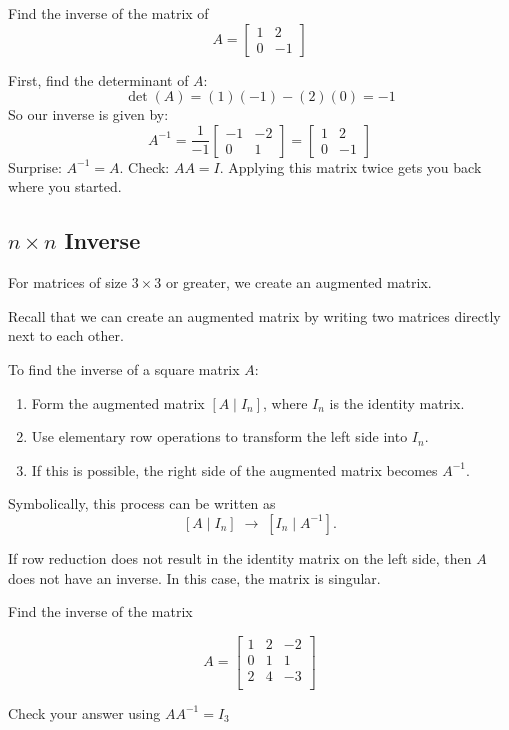 \begin{Exercise}[title={$2 \times 2$ Practice}, label={ex:inverse1}]
Find the inverse of the matrix of
\[
A = \begin{bmatrix}
1 & 2  \\
0 & -1 
\end{bmatrix}
\]
\end{Exercise}
\begin{Answer}[ref={ex:inverse1}]
First, find the determinant of $A$:
$$\det(A) = (1)(-1) - (2)(0) = -1$$
So our inverse is given by:
$$A^{-1} = \frac{1}{-1}\begin{bmatrix}
-1 & -2 \\
0 & 1
\end{bmatrix} = \begin{bmatrix}
1 & 2 \\
0 & -1
\end{bmatrix}$$
Surprise: $A^{-1} = A$. Check: $AA = I$. Applying this matrix twice gets you
back where you started.

\end{Answer}
\subsection*{$n \times n$ Inverse}
For matrices of size \(3 \times 3\) or greater, we create an augmented matrix.

Recall that we can create an augmented matrix by writing two matrices directly next to each other. 

To find the inverse of a square matrix \(A\):
\begin{enumerate}
\item Form the augmented matrix \([A \mid I_n]\), where \(I_n\) is the identity matrix.
\item Use elementary row operations to transform the left side into \(I_n\).
\item If this is possible, the right side of the augmented matrix becomes \(A^{-1}\).
\end{enumerate}


Symbolically, this process can be written as
\[
[A \mid I_n] \;\longrightarrow\; [I_n \mid A^{-1}].
\]

If row reduction does not result in the identity matrix on the left side, then \(A\) does not have an inverse.
In this case, the matrix is singular.

\begin{Exercise}[title={A bigger inverse}, label={ex:inverse2}]

Find the inverse of the matrix

$$A = \begin{bmatrix}
1 & 2 & -2 \\
0 & 1 & 1 \\ 
2 & 4 & -3 \\
\end{bmatrix}$$

Check your answer using $AA^{-1}=I_3$
\end{Exercise}

